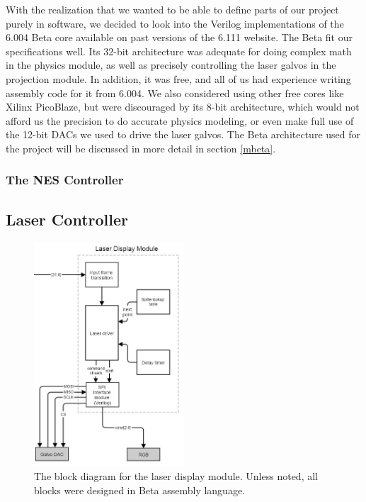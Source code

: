 \documentclass{article}
\begin{document}
With the realization that we wanted to be able to define parts of our project purely in software, we decided to look into the Verilog implementations of the 6.004 Beta core available on past versions of the 6.111 website. The Beta fit our specifications well. Its 32-bit architecture was adequate for doing complex math in the physics module, as well as precisely controlling the laser galvos in the projection module. In addition, it was free, and all of us had experience writing assembly code for it from 6.004. We also considered using other free cores like Xilinx PicoBlaze, but were discouraged by its 8-bit architecture, which would not afford us the precision to do accurate physics modeling, or even make full use of the 12-bit DACs we used to drive the laser galvos. The Beta architecture used for the project will be discussed in more detail in section \ref{mbeta}.


\subsubsection{The NES Controller}

\subsection{Laser Controller} \label{laser}

\begin{figure}[H]
\begin{center}
\includegraphics[width=0.5\textwidth]{laser}
\caption{The block diagram for the laser display module. Unless noted, all blocks were designed in Beta assembly language.}
\end{center}
\end{figure}
\end{document}

